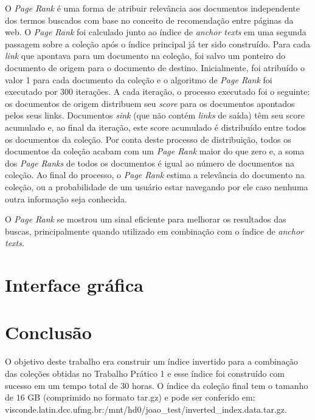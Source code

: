 \documentclass{article}
\begin{document}
O \textit{Page Rank} é uma forma de atribuir relevância aos documentos independente dos termos buscados com base
no conceito de recomendação entre páginas da web. O \textit{Page Rank} foi calculado junto ao índice de \textit{anchor texts} 
em uma segunda passagem sobre a coleção após o índice principal já ter sido construído. Para cada \textit{link}
que apontava para um documento na coleção, foi salvo um ponteiro do documento de origem para o documento de destino. Inicialmente,
foi atribuído o valor 1 para cada documento da coleção e o algoritmo de \textit{Page Rank} foi executado por 300 iterações. A cada
iteração, o processo executado foi o seguinte: os documentos de origem distribuem seu \textit{score} para os documentos apontados 
pelos seus links. Documentos \textit{sink} (que não contém \textit{links} de saída) têm seu score acumulado e, ao final da iteração,
este score acumulado é distribuído entre todos os documentos da coleção. Por conta deste processo de distribuição, todos os documentos
da coleção acabam com um \textit{Page Rank} maior do que zero e, a soma dos \textit{Page Ranks} de todos os documentos é igual ao
número de documentos na coleção. Ao final do processo, o \textit{Page Rank} estima a relevância do documento na coleção, ou a 
probabilidade de um usuário estar navegando por ele caso nenhuma outra informação seja conhecida.

O \textit{Page Rank} se mostrou um sinal eficiente para melhorar os resultados das buscas, principalmente quando utilizado
em combinação com o índice de \textit{anchor texts}.

\section{Interface gráfica}

\section{Conclusão}

O objetivo deste trabalho era construir um índice invertido para a combinação das coleções obtidas no
Trabalho Prático 1 e esse índice foi construído com sucesso em um tempo total de 30 horas. O índice da coleção final
tem o tamanho de 16 GB (comprimido no formato tar.gz) e pode ser conferido em: \newline
visconde.latin.dcc.ufmg.br:/mnt/hd0/joao\_test/inverted\_index.data.tar.gz.
\end{document}
